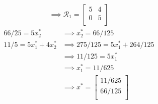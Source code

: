 \documentclass{article}
\begin{document}
\begin{enumerate}
\begin{enumerate}
\begin{align*}
          \implies 
          \mathcal{R}_1 =
          \begin{bmatrix}
              5 & 4 \\
              0 & 5 \\
          \end{bmatrix}
      \end{align*}
      \begin{align*}
          66/25 = 5x^*_2 &\implies x^*_2 = 66/125 \\
          11/5 = 5x^*_1 + 4x^*_2 &\implies 275/125 = 5x^*_1 + 264/125 \\
          &\implies 11/125 = 5x^*_1 \\
          &\implies x^*_1 = 11/625 \\
          &\implies x^* =
          \begin{bmatrix}
            11/625 \\
            66/125 \\
          \end{bmatrix}
      \end{align*}
  \end{enumerate}
\end{enumerate}
\end{document}
